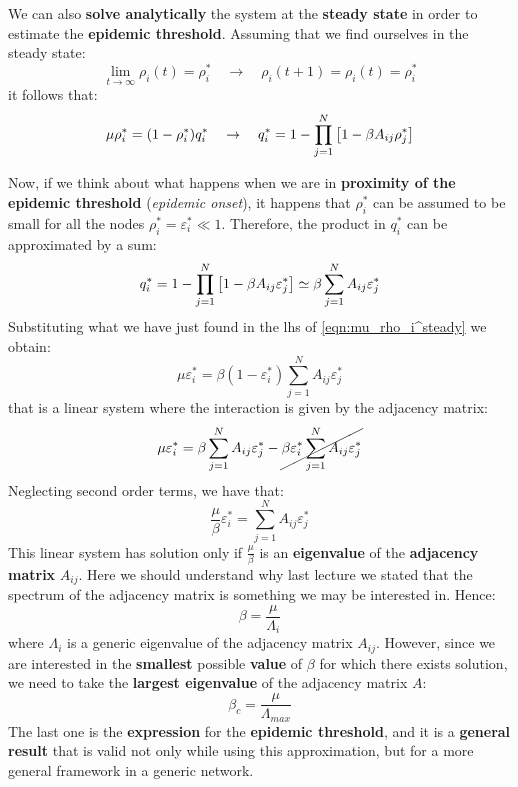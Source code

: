 \documentclass[../main/main.tex]{subfiles}
\begin{document}
We can also \textbf{solve analytically} the system at the \textbf{steady state} in order to estimate the \textbf{epidemic threshold}. Assuming that we find ourselves in the steady state:
\begin{equation*}
  \lim_{t \rightarrow \infty } \rho _i (t) = \rho _i ^* \quad \rightarrow \quad \rho _i (t+1) = \rho _i (t) = \rho _i^*
\end{equation*}
it follows that:
\begin{equation}
\label{eqn:mu_rho_i^steady}
  \mu \rho _i^* = (1- \rho _i^*) q_i^* \quad \rightarrow \quad q_i^* = 1 - \prod_{j=1}^{N} \qty[1- \beta A_{ij} \rho _j^*]
\end{equation}

Now, if we think about what happens when we are in \textbf{proximity of the epidemic threshold} (\textit{epidemic onset}), it happens that \( \rho _i^* \) can be assumed to be small for all the nodes \( \rho _i^* = \varepsilon _i^* \ll 1 \).
Therefore, the product in \( q_i^* \) can be approximated by a sum:
\begin{equation}
  q_i^* = 1 - \prod_{j=1}^{N} \qty[1- \beta A_{ij} \varepsilon _j^*] \simeq \beta \sum_{j=1}^{N} A_{ij} \varepsilon _j^*
\end{equation}
Substituting what we have just found in the lhs of \ref{eqn:mu_rho_i^steady} we obtain:
\begin{equation}
  \mu \varepsilon _i^* = \beta (1- \varepsilon _i^*) \sum_{j=1}^{N} A_{ij} \varepsilon _{j}^*
\end{equation}
that is a linear system where the interaction is given by the adjacency matrix:
\begin{equation*}
  \mu \varepsilon _i^* = \beta \sum_{j=1}^{N} A_{ij} \varepsilon _{j}^* - \cancel{ \beta \varepsilon _i^* \sum_{j=1}^{N} A_{ij} \varepsilon _{j}^* }
\end{equation*}
Neglecting second order terms, we have that:
\begin{equation}
  \frac{\mu }{\beta } \varepsilon _i^* = \sum_{j=1}^{N} A_{ij} \varepsilon _j^*
\end{equation}
This linear system has solution only if \( \frac{\mu }{\beta } \) is an \textbf{eigenvalue} of the \textbf{adjacency matrix} \( A_{ij} \). Here we should understand why last lecture we stated that the spectrum of the adjacency matrix is something we may be interested in.
Hence:
\begin{equation}
  \beta = \frac{\mu }{\Lambda _i}
\end{equation}
where \( \Lambda _i \) is a generic eigenvalue of the adjacency matrix \( A_{ij} \). However, since we are interested in the \textbf{smallest} possible \textbf{value} of \( \beta  \) for which there exists solution, we need to take the \textbf{largest eigenvalue} of the adjacency matrix \( A \):
\begin{equation}
  \beta _c = \frac{\mu }{\Lambda _{max}}
\end{equation}
The last one is the \textbf{expression} for the \textbf{epidemic threshold}, and it is a \textbf{general result} that is valid not only while using this approximation, but for a more general framework in a generic network.
\end{document}
